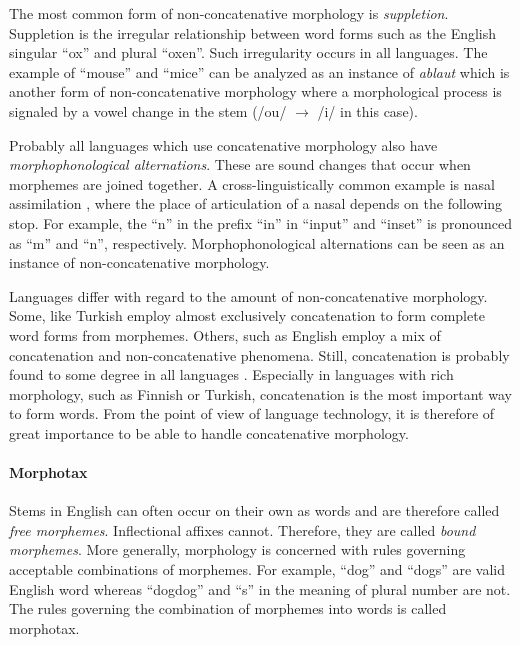The most common form of non-concatenative morphology is {\it
  suppletion}. Suppletion is the irregular relationship between word
forms such as the English singular ``ox'' and plural ``oxen''. Such
irregularity occurs in all languages. The example of ``mouse'' and
``mice'' can be analyzed as an instance of {\it ablaut} which is
another form of non-concatenative morphology where a morphological
process is signaled by a vowel change in the stem (/ou/ $\rightarrow$
/i/ in this case). 

Probably all languages which use concatenative morphology also have
{\it morphophonological alternations}. These are sound changes that
occur when morphemes are joined together. A cross-linguistically
common example is nasal assimilation \citep[p. 29]{Carr1993}, where
the place of articulation of a nasal depends on the following
stop. For example, the ``n'' in the prefix ``in'' in ``input'' and
``inset'' is pronounced as ``m'' and ``n'',
respectively. Morphophonological alternations can be seen as an
instance of non-concatenative morphology.

Languages differ with regard to the amount of non-concatenative
morphology. Some, like Turkish employ almost exclusively concatenation
to form complete word forms from morphemes. Others, such as English
employ a mix of concatenation and non-concatenative phenomena. Still,
concatenation is probably found to some degree in all languages
\cite{someone}. Especially in languages with rich morphology, such as
Finnish or Turkish, concatenation is the most important way to form
words. From the point of view of language technology, it is therefore
of great importance to be able to handle concatenative morphology.

\paragraph{Morphotax} Stems in English can often occur on their own as
words and are therefore called {\it free morphemes}. Inflectional
affixes cannot. Therefore, they are called {\it bound morphemes}. More
generally, morphology is concerned with rules governing acceptable
combinations of morphemes. For example, ``dog'' and ``dogs'' are valid
English word whereas ``dogdog'' and ``s'' in the meaning of plural
number are not. The rules governing the combination of morphemes into
words is called morphotax.

